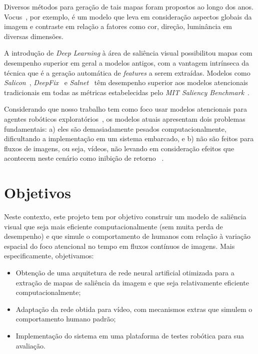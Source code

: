\documentclass[11pt]{article}
\newcommand{\tit}[1]{\textit{#1}}
\begin{document}
Diversos métodos para geração de tais mapas foram propostos ao longo dos anos.
Vocus~\cite{ref:vocus}, por exemplo, é um modelo que leva em consideração
aspectos globais da imagem e contraste em relação a fatores
como cor, direção, luminância em diversas dimensões.

A introdução de \tit{Deep Learning} à área de saliência visual
possibilitou mapas com desempenho
superior em geral a modelos antigos, com a vantagem intrínseca da técnica que
é a geração automática de \tit{features} a serem extraídas.
Modelos como \tit{Salicon}~\cite{ref:salicon}, \tit{DeepFix}~\cite{ref:deepfix}
e \tit{Salnet}~\cite{ref:shallow-deep} têm desempenho superior aos modelos
atencionais tradicionais em todas as métricas
estabelecidas pelo \tit{MIT Saliency Benchmark}~\cite{ref:mit300-bm}.

Considerando que nosso trabalho tem como foco usar modelos atencionais para
agentes robóticos exploratórios~\cite{ref:previous-proposal},
os modelos atuais apresentam dois problemas
fundamentais: a) eles são demasiadamente pesados computacionalmente,
dificultando a implementação em um sistema embarcado, e b) não são
feitos para fluxos de imagens, ou seja, vídeos, não levando em
consideração efeitos que acontecem neste cenário como inibição de retorno
~\cite{ref:esther-thesis}.

\section{Objetivos}
Neste contexto, este projeto tem por objetivo construir um modelo de saliência
visual que seja mais eficiente computacionalmente
(sem muita perda de desempenho) e que simule o comportamento de humanos
com relação à variação espacial do foco atencional no tempo em fluxos
contínuos de imagens.
Mais especificamente, objetivamos:

\begin{itemize}
	\item Obtenção de uma arquitetura de rede neural artificial otimizada para
        a extração de mapas de saliência da imagem e que seja relativamente
        eficiente computacionalmente;
	\item Adaptação da rede obtida para vídeo, com mecanismos extras
        que simulem o comportamento humano padrão;
	\item Implementação do sistema em uma plataforma de testes robótica
        para sua avaliação.
\end{itemize}
\end{document}
